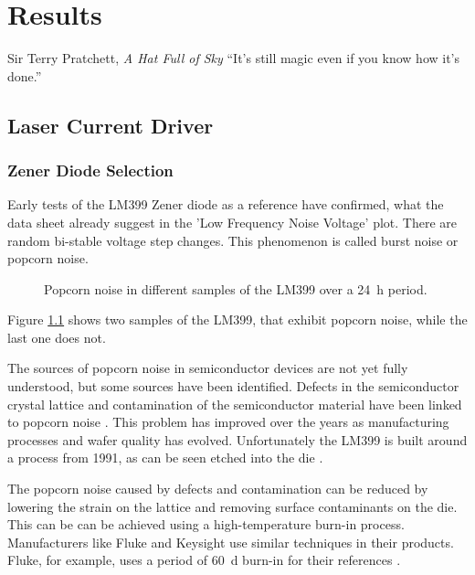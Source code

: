 \chapter{Results}
\begin{chapquote}{Sir Terry Pratchett, \textit{A Hat Full of Sky}}
``It's still magic even if you know how it's done.''
\end{chapquote}

\section{Laser Current Driver}
\subsection{Zener Diode Selection}
Early tests of the LM399 Zener diode as a reference have confirmed, what the data sheet \cite{datasheet_LM399} already suggest in the 'Low Frequency Noise Voltage' plot. There are random bi-stable voltage step changes. This phenomenon is called burst noise or popcorn noise.

\begin{figure}[ht]
    \centering
    
    \caption{Popcorn noise in different samples of the LM399 over a \qty{24}{\hour} period.}
    \label{fig:popcorn_noise_lm399}
\end{figure}

Figure \ref{fig:popcorn_noise_lm399} shows two samples of the LM399, that exhibit popcorn noise, while the last one does not.

The sources of popcorn noise in semiconductor devices are not yet fully understood, but some sources have been identified. Defects in the semiconductor crystal lattice and contamination of the semiconductor material have been linked to popcorn noise \cite{technote_ti_popcorn_noise}. This problem has improved over the years as manufacturing processes and wafer quality has evolved. Unfortunately the LM399 is built around a process from 1991, as can be seen etched into the die \cite{lm399_richi}.

The popcorn noise caused by defects and contamination can be reduced by lowering the strain on the lattice and removing surface contaminants on the die. This can be can be achieved using a high-temperature burn-in process. Manufacturers like Fluke and Keysight use similar techniques in their products. Fluke, for example, uses a period of \qty{60}{\day} burn-in for their references \cite{zener_popcorn_noise}.

